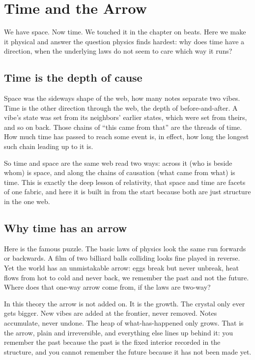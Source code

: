 \section{Time and the Arrow}

We have space. Now time. We touched it in the chapter on beats. Here we make it physical and answer the question physics finds hardest: why does time have a direction, when the underlying laws do not seem to care which way it runs?

\subsection{Time is the depth of cause}

Space was the sideways shape of the web, how many notes separate two vibes. Time is the other direction through the web, the depth of before-and-after. A vibe's state was set from its neighbors' earlier states, which were set from theirs, and so on back. Those chains of ``this came from that'' are the threads of time. How much time has passed to reach some event is, in effect, how long the longest such chain leading up to it is.

So time and space are the same web read two ways: across it (who is beside whom) is space, and along the chains of causation (what came from what) is time. This is exactly the deep lesson of relativity, that space and time are facets of one fabric, and here it is built in from the start because both are just structure in the one web.

\subsection{Why time has an arrow}

Here is the famous puzzle. The basic laws of physics look the same run forwards or backwards. A film of two billiard balls colliding looks fine played in reverse. Yet the world has an unmistakable arrow: eggs break but never unbreak, heat flows from hot to cold and never back, we remember the past and not the future. Where does that one-way arrow come from, if the laws are two-way?

In this theory the arrow is not added on. It is the growth. The crystal only ever gets bigger. New vibes are added at the frontier, never removed. Notes accumulate, never undone. The heap of what-has-happened only grows. That is the arrow, plain and irreversible, and everything else lines up behind it: you remember the past because the past is the fixed interior recorded in the structure, and you cannot remember the future because it has not been made yet.


